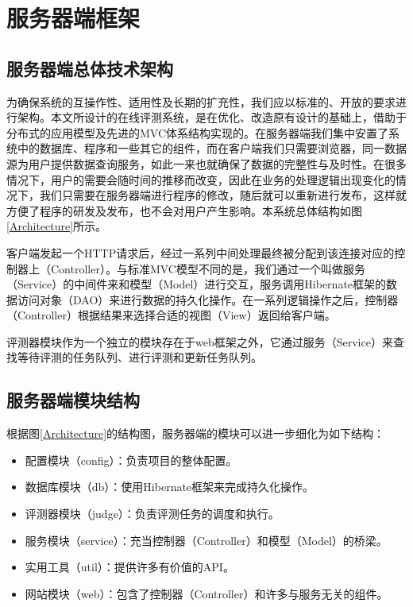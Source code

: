 \section{服务器端框架}
\subsection{服务器端总体技术架构}
为确保系统的互操作性、适用性及长期的扩充性，我们应以标准的、开放的要求进行架构。本文所设计的在线评测系统，是在优化、改造原有设计的基础上，借助于分布式的应用模型及先进的MVC体系结构实现的。在服务器端我们集中安置了系统中的数据库、程序和一些其它的组件，而在客户端我们只需要浏览器，同一数据源为用户提供数据查询服务，如此一来也就确保了数据的完整性与及时性。在很多情况下，用户的需要会随时间的推移而改变，因此在业务的处理逻辑出现变化的情况下，我们只需要在服务器端进行程序的修改，随后就可以重新进行发布，这样就方便了程序的研发及发布，也不会对用户产生影响。本系统总体结构如图\ref{Architecture}所示。

客户端发起一个HTTP请求后，经过一系列中间处理最终被分配到该连接对应的控制器上（Controller）。与标准MVC模型不同的是，我们通过一个叫做服务（Service）的中间件来和模型（Model）进行交互，服务调用Hibernate框架的数据访问对象（DAO）来进行数据的持久化操作。在一系列逻辑操作之后，控制器（Controller）根据结果来选择合适的视图（View）返回给客户端。

评测器模块作为一个独立的模块存在于web框架之外，它通过服务（Service）来查找等待评测的任务队列、进行评测和更新任务队列。

\subsection{服务器端模块结构}\label{sec:serverModelStructure}
根据图\ref{Architecture}的结构图，服务器端的模块可以进一步细化为如下结构：
\begin{itemize}
	\item 配置模块（config）：负责项目的整体配置。
	\item 数据库模块（db）：使用Hibernate框架来完成持久化操作。
	\item 评测器模块（judge）：负责评测任务的调度和执行。
	\item 服务模块（service）：充当控制器（Controller）和模型（Model）的桥梁。
	\item 实用工具（util）：提供许多有价值的API。
	\item 网站模块（web）：包含了控制器（Controller）和许多与服务无关的组件。
\end{itemize}

